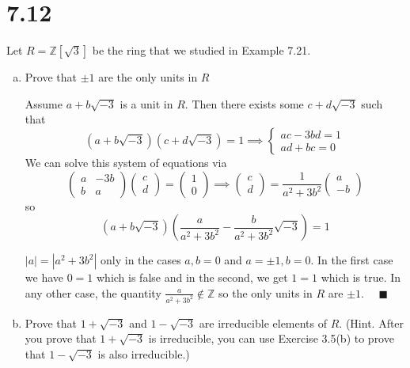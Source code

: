 \documentclass[12pt]{article}
\newcommand{\Z}{\mathbb{Z}}
\newcommand{\qed}{\quad \blacksquare}
\newcommand{\abs}[1]{\left\vert #1 \right\vert}
\begin{document}
\section*{7.12}
Let $R = \Z[\sqrt 3]$ be the ring that we studied in Example 7.21.
\begin{enumerate}[(a)]
    \item Prove that $\pm 1$ are the only units in $R$

        \color{blue}
            Assume $a + b\sqrt{-3}$ is a unit in $R$. Then there exists some $c + d\sqrt{-3}$ such that
            \[(a + b\sqrt{-3})(c + d\sqrt{-3}) = 1 \implies \begin{cases}
                ac - 3bd = 1\\
                ad + bc = 0
            \end{cases}\]
            We can solve this system of equations via 
            \[\begin{pmatrix}
                a & -3b\\
                b & a
            \end{pmatrix} \begin{pmatrix}
                c\\
                d
            \end{pmatrix} = \begin{pmatrix}
                1\\
                0  
            \end{pmatrix} \implies \begin{pmatrix}
                c\\
                d
            \end{pmatrix} = \frac{1}{a^2 + 3b^2}\begin{pmatrix}
                a\\
                -b 
            \end{pmatrix}\]
            so 
            \[(a + b\sqrt{-3})(\frac{a}{a^2 + 3b^2} - \frac{b}{a^2 + 3b^2}\sqrt{-3}) = 1\]
            
            $\abs{a} = \abs{a^2 + 3b^2}$ only in the cases $a, b = 0$ and $a = \pm 1, b = 0$. In the first case we have $0 = 1$ which is false and in the second, we get $1 = 1$ which is true. In any other case, the quantity $\frac{a}{a^2 + 3b^2} \not \in \Z$ so the only units in $R$ are $\pm 1$. $\qed$ 
        \color{black}

    \item Prove that $1 + \sqrt{-3}$ and $1 - \sqrt{-3}$ are irreducible elements of $R$. (Hint. After you prove that $1 + \sqrt{-3}$ is irreducible, you can use Exercise 3.5(b) to prove that $1 - \sqrt{-3}$ is also irreducible.)
            

\end{enumerate}
\end{document}
